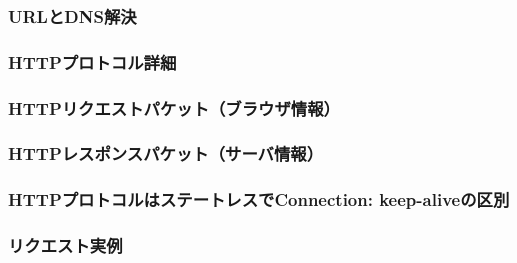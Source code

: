 
\subsubsection{URLとDNS解決}

\subsubsection{HTTPプロトコル詳細}

\subsubsection{HTTPリクエストパケット（ブラウザ情報）}

\subsubsection{HTTPレスポンスパケット（サーバ情報）}

\subsubsection{HTTPプロトコルはステートレスでConnection: keep-aliveの区別}

\subsubsection{リクエスト実例}

